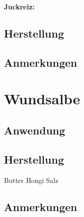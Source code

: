 \textbf{Juckreiz:} \\ 

\subsection{Herstellung}

\subsection{Anmerkungen}





\section{Wundsalbe}

\subsection{Anwendung}

\subsection{Herstellung}

Butter Hongi Salz

\subsection{Anmerkungen}



